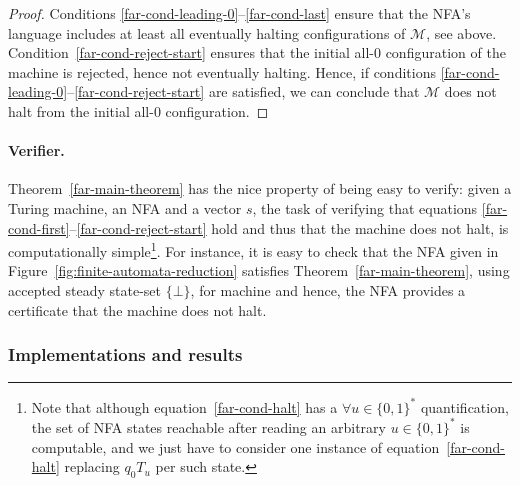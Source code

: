 \begin{proof}
    Conditions \eqref{far-cond-leading-0}--\eqref{far-cond-last} ensure that the NFA's language includes at least all eventually halting configurations of $\mathcal{M}$, see above. Condition~\eqref{far-cond-reject-start} ensures that the initial all-0 configuration of the machine is rejected, hence not eventually halting. Hence, if conditions \eqref{far-cond-leading-0}--\eqref{far-cond-reject-start} are satisfied, we can conclude that $\mathcal{M}$ does not halt from the initial all-0 configuration.
\end{proof}

\paragraph{Verifier.} Theorem~\ref{far-main-theorem} has the nice property of being easy to verify: given a Turing machine, an NFA and a vector $s$, the task of verifying that equations \eqref{far-cond-first}--\eqref{far-cond-reject-start} hold and thus that the machine does not halt, is computationally simple\footnote{Note that although equation~\eqref{far-cond-halt} has a $\forall u\in\{0, 1\}^*$ quantification, the set of NFA states reachable after reading an arbitrary $u \in \{0,1\}^*$ is computable, and we just have to consider one instance of equation~\eqref{far-cond-halt} replacing $q_0 T_u$ per such state.}. For instance, it is easy to check that the NFA given in Figure~\ref{fig:finite-automata-reduction} satisfies Theorem~\ref{far-main-theorem}, using accepted steady state-set $\{\bot\}$, for machine  and hence, the NFA provides a certificate that the machine does not halt.



\subsubsection{Implementations and results}\label{sec:FAR:results}



